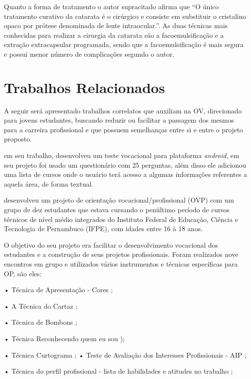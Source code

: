 \documentclass[
	12pt,				%
    oneside,			%
	a4paper,			%
	english,			%
	french,				%
	spanish,			%
	brazil,				%
	]{abntex2}
\begin{document}
Quanto a forma de tratamento o autor supracitado afirma que \enquote{O único tratamento curativo da catarata é o cirúrgico e consiste em substituir o cristalino opaco por prótese denominada de lente intraocular.}. As duas técnicas mais conhecidas para realizar a cirurgia da catarata são a facoemulsificação e a extração extracapsular programada, sendo que a facoemulsificação é mais segura e possui menor número de complicações segundo o autor. 

\chapter{Trabalhos Relacionados}

A seguir será apresentado trabalhos correlatos que auxiliam na OV, direcionado para jovens estudantes, buscando reduzir ou facilitar a passagem dos mesmos para a carreira profissional e que possuem semelhanças entre si e entre o projeto proposto.

 em seu trabalho, desenvolveu um teste vocacional para plataforma \textit{android}, em seu projeto foi usado um questionário com 25 perguntas, além disso ele adicionou uma lista de cursos onde o usuário terá acesso a algumas informações referentes a aquela área, de forma textual.

 desenvolveu um projeto de orientação vocacional/profissional (OVP) com um grupo de dez estudantes que estava cursando o penúltimo período de cursos técnicos de nível médio integrados do Instituto Federal de Educação, Ciência e Tecnologia de Pernambuco (IFPE), com idades entre 16 à 18 anos. 

O objetivo do seu projeto era facilitar o desenvolvimento vocacional dos estudantes e a construção de seus projetos profissionais. Foram realizados nove encontros em grupo e utilizados vários instrumentos e técnicas específicas para OP, são eles: 

•	Técnica de Apresentação - Cores \cite{lucchiari1993pensando};

•	A Técnica do Cartaz \cite{antunes2003experiencia}; 

•	Técnica de Bombons \cite{levenfus2010tecnica};

•	Técnica Reconhecendo quem eu sou \cite{neiva}); 

•	Técnica Curtograma \cite{spaccaquerche2009orientaccao}; 
•	Teste de Avaliação dos Interesses Profissionais - AIP \cite{levenfus2009aip}; 

•	Técnica do perfil profissional - lista de habilidades e atitudes no trabalho \cite{d2009tecnicas}; 
\end{document}
